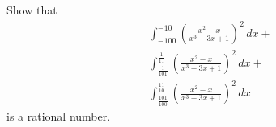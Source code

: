 Show that
\begin{gather*}
\int_{-100}^{-10} \left( \frac{x^2 - x}{x^3 - 3x + 1} \right)^2\,dx + \\
\int_{\frac{1}{101}}^{\frac{1}{11}} \left( \frac{x^2 - x}{x^3 - 3x + 1} \right)^2\,dx + \\
\int_{\frac{101}{100}}^{\frac{11}{10}} \left( \frac{x^2 - x}{x^3 - 3x + 1} \right)^2\,dx
\end{gather*}
is a rational number.
